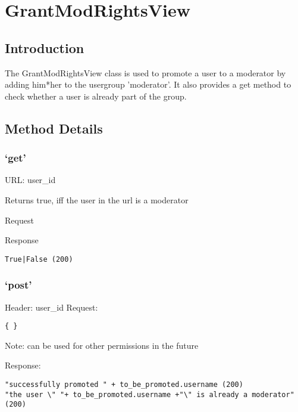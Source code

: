 \chapter*{GrantModRightsView}

\section*{Introduction}\label{introduction}

The GrantModRightsView class is used to promote a user to a moderator by adding him*her to the usergroup 'moderator'. It also provides a get method to check whether a user is already part of the group.

\section*{Method Details}\label{method-details}

\subsection*{\texorpdfstring{`get'}{get}}\label{get}

URL: user\_id

Returns true, iff the user in the url is a moderator

Request

Response

\begin{verbatim}
True|False (200)
\end{verbatim}

\subsection*{\texorpdfstring{`post'}{post}}\label{post}

Header: user\_id Request:

\begin{verbatim}
{ }
\end{verbatim}

Note: can be used for other permissions in the future

Response:

\begin{verbatim}
"successfully promoted " + to_be_promoted.username (200)
"the user \" "+ to_be_promoted.username +"\" is already a moderator" (200)
\end{verbatim}
